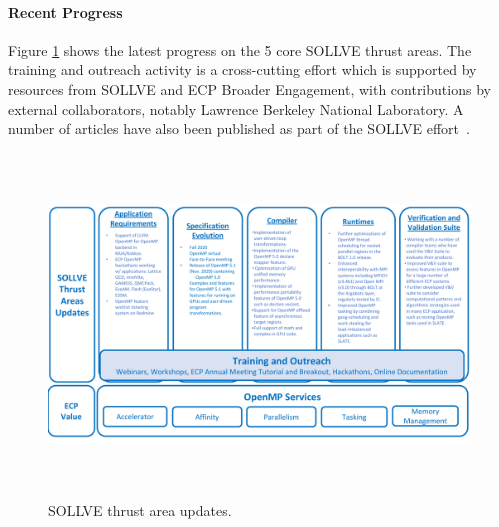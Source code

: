 \paragraph{Recent Progress}
Figure \ref{fig:sollve-update} shows the latest progress on the 5 core SOLLVE thrust areas. The training and outreach activity is a
cross-cutting effort which is supported by resources from SOLLVE and ECP Broader Engagement, with contributions by external collaborators, notably Lawrence Berkeley National Laboratory.   
A number of articles have also been published as part of the SOLLVE
effort~\cite{9669317, openmp-tr6,zinenko.cc.2018,vandv2019,
tregion, Mishra:2019:KFA:3314872.3314915, udm, loopTransPragmas,ompautotuneFramework, osti_1559911, 
DBLP:conf/iwomp/ScoglandSOHES19, DBLP:conf/iwomp/0001WLSS19,
DBLP:conf/iwomp/KaleIKKC19, Bak2019OptimizedEO, lsrt, boltPACT19, machlearnoffload, DBLP:conf/sc/MishraLKFC17, Bak2019OptimizedEO, portOmpOff,kruse2021clangast}.


\begin{figure}[t]
\includegraphics[width=1.0\linewidth,height=9.1cm]{projects/2.3.2-Tools/2.3.2.11-SOLLVE/SOLLVE-progress}
\caption{\label{fig:sollve-update} SOLLVE thrust area updates.}
\end{figure}

